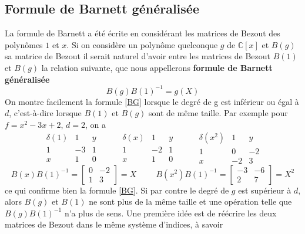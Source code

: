 \documentclass{article}
\theoremstyle{plain}%
\theoremstyle{definition}
\theoremstyle{remark}
\newcommand{\C}{\mathbb{C}}
\begin{document}
\subsection{Formule de Barnett généralisée}
\label{Bar_gen}
La formule de Barnett a été écrite en considérant les matrices de Bezout des polynômes $1$ et $x$. 
Si on considère un polynôme quelconque $g$ de $\C[x]$ et $B(g)$ sa matrice de Bezout il serait naturel d'avoir entre les matrices de Bezout $B(1)$ et $B(g)$ la relation suivante, que nous appellerons {\bf formule de Barnett généralisée}
\begin{equation}
	\label{BG}
	B(g)B(1)^{-1} = g(X)
\end{equation}
On montre facilement la formule \ref{BG} lorsque le degré de g est inférieur ou égal à $d$, c'est-à-dire lorsque $B(1)$ et $B(g)$ sont de même taille. Par exemple pour $f = x^2 - 3x + 2$, $d = 2$, on a
$$
\begin{array}{c|cc}
	\delta(1) & 1 & y \\
	\hline
	1 & -3 & 1 \\
	x & 1 & 0
\end{array}
\hspace{1cm}
\begin{array}{c|cc}
	\delta(x) & 1 & y \\
	\hline
	1 & -2 & 1 \\
	x & 1 & 0
\end{array}
\hspace{1cm}
\begin{array}{c|cc}
	\delta(x^2) & 1 & y \\
	\hline
	1 & 0 & -2 \\
	x & -2 & 3
\end{array}
$$
\begin{equation}
	B(x)B(1)^{-1} = 
	\begin{bmatrix}
		0 & -2 \\
		1 & 3
	\end{bmatrix}
	= X
	\hspace{1cm}
	B(x^2)B(1)^{-1} = 
	\begin{bmatrix}
		-3 & -6 \\
		2 & 7
	\end{bmatrix}
	= X^2
\end{equation}
ce qui confirme bien la formule \ref{BG}.
Si par contre le degré de $g$ est supérieur à $d$, alors $B(g)$ et $B(1)$ ne sont plus de la même taille et une opération telle que $B(g)B(1)^{-1}$ n'a plus de sens. Une première idée est de réécrire les deux matrices de Bezout dans le même système d'indices, à savoir 
\end{document}
